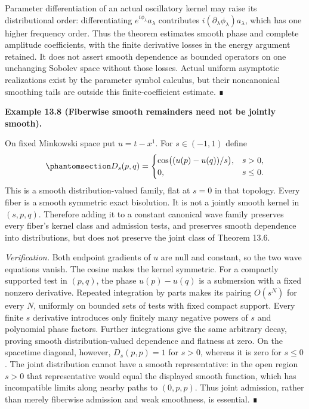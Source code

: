 \documentclass[
  english,
  11pt,
  reqno]{amsart}
\makeatletter
\newcommand{\pandocstatementheading}[1]{%
  \par\if@nobreak\else
    \addpenalty{\@beginparpenalty}%
    \addvspace{.5\baselineskip plus .2\baselineskip minus .2\baselineskip}%
  \fi
  {\normalfont\bfseries #1\par}%
  \nobreak\@afterindenttrue\@afterheading
}
\makeatother
\begin{document}
Parameter differentiation of an actual oscillatory kernel may raise its
distributional order: differentiating \(e^{i\phi_\lambda}a_\lambda\)
contributes \(i(\partial_\lambda\phi_\lambda)a_\lambda\), which has one
higher frequency order. Thus the theorem estimates smooth phase and
complete amplitude coefficients, with the finite derivative losses in
the energy argument retained. It does not assert smooth dependence as
bounded operators on one unchanging Sobolev space without those losses.
Actual uniform asymptotic realizations exist by the parameter symbol
calculus, but their noncanonical smoothing tails are outside this
finite-coefficient estimate. ∎

\pandocstatementheading{\protect{}\label{ex:weak-smooth-kernel-family}Example 13.8 (Fiberwise smooth remainders need not be jointly smooth).}

On fixed Minkowski space put \(u=t-x^1\). For \(s\in(-1,1)\) define
\begin{equation}\protect\phantomsection\label{eq:family-fiberwise-smooth-counterexample}{
D_s(p,q)=
\begin{cases}
\cos\bigl((u(p)-u(q))/s\bigr),&s>0,\\
0,&s\le0.
\end{cases}
}\end{equation} This is a smooth distribution-valued family, flat at
\(s=0\) in that topology. Every fiber is a smooth symmetric exact
bisolution. It is not a jointly smooth kernel in \((s,p,q)\). Therefore
adding it to a constant canonical wave family preserves every fiber's
kernel class and admission tests, and preserves smooth dependence into
distributions, but does not preserve the joint class of Theorem 13.6.

\emph{Verification.} Both endpoint gradients of \(u\) are null and
constant, so the two wave equations vanish. The cosine makes the kernel
symmetric. For a compactly supported test in \((p,q)\), the phase
\(u(p)-u(q)\) is a submersion with a fixed nonzero derivative. Repeated
integration by parts makes its pairing \(O(s^N)\) for every \(N\),
uniformly on bounded sets of tests with fixed compact support. Every
finite \(s\) derivative introduces only finitely many negative powers of
\(s\) and polynomial phase factors. Further integrations give the same
arbitrary decay, proving smooth distribution-valued dependence and
flatness at zero. On the spacetime diagonal, however, \(D_s(p,p)=1\) for
\(s>0\), whereas it is zero for \(s\le0\). The joint distribution cannot
have a smooth representative: in the open region \(s>0\) that
representative would equal the displayed smooth function, which has
incompatible limits along nearby paths to \((0,p,p)\). Thus joint
admission, rather than merely fiberwise admission and weak smoothness,
is essential. ∎
\end{document}
